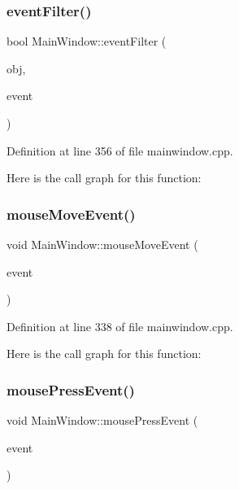 \subsubsection{\texorpdfstring{event\+Filter()}{eventFilter()}}
{\footnotesize\ttfamily bool Main\+Window\+::event\+Filter (\begin{DoxyParamCaption}\item[{Q\+Object $\ast$}]{obj,  }\item[{Q\+Event $\ast$}]{event }\end{DoxyParamCaption})\hspace{0.3cm}{\ttfamily [protected]}}



Definition at line 356 of file mainwindow.\+cpp.

Here is the call graph for this function\+:
\mbox{\label{class_main_window_a2cf42454562815dd44c716e78d515697}} 
\subsubsection{\texorpdfstring{mouse\+Move\+Event()}{mouseMoveEvent()}}
{\footnotesize\ttfamily void Main\+Window\+::mouse\+Move\+Event (\begin{DoxyParamCaption}\item[{Q\+Mouse\+Event $\ast$}]{event }\end{DoxyParamCaption})\hspace{0.3cm}{\ttfamily [protected]}}



Definition at line 338 of file mainwindow.\+cpp.

Here is the call graph for this function\+:
\mbox{\label{class_main_window_a2b5463ae209a03d1680b39c950dac8be}} 
\subsubsection{\texorpdfstring{mouse\+Press\+Event()}{mousePressEvent()}}
{\footnotesize\ttfamily void Main\+Window\+::mouse\+Press\+Event (\begin{DoxyParamCaption}\item[{Q\+Mouse\+Event $\ast$}]{event }\end{DoxyParamCaption})\hspace{0.3cm}{\ttfamily [protected]}}



